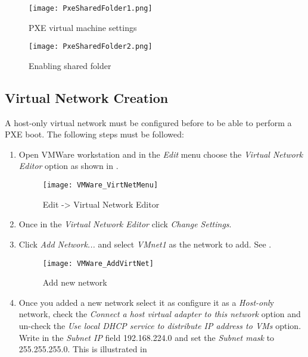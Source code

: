 \begin{appendices}
\begin{figure}
	\centering
	\texttt{[image: PxeSharedFolder1.png]}
		\caption{PXE virtual machine settings}
	\label{fig:PxeSharedFolder1}
\end{figure}

\begin{figure}
	\centering
	\texttt{[image: PxeSharedFolder2.png]}
		\caption{Enabling shared folder}
	\label{fig:PxeSharedFolder2}
\end{figure}

\subsection{Virtual Network Creation}
\label{sect:VirtNetwork}

A host-only virtual network must be configured before to be able to perform a PXE boot. The
following steps must be followed:

\begin{enumerate}
	\item Open VMWare workstation and in the \textit{Edit} menu choose the \textit{Virtual Network
Editor} option as shown in .

\begin{figure}
	\centering
	\texttt{[image: VMWare\_VirtNetMenu]}
		\caption{Edit -> Virtual Network Editor}
	\label{fig:VMwareMenu}
\end{figure}

	\item Once in the \textit{Virtual Network Editor} click \textit{Change Settings}.

	\item Click \textit{Add Network...} and select \textit{VMnet1} as the network to add. See
.

\begin{figure}
	\centering
	\texttt{[image: VMWare\_AddVirtNet]}
		\caption{Add new network}
	\label{fig:VmWareAddNetwork}
\end{figure}

	\item Once you added a new network select it as configure it as a \textit{Host-onl}y network,
check the \textit{Connect a host virtual adapter to this network} option and un-check the
\textit{Use local DHCP service to distribute IP address to VMs} option. Write in the
\textit{Subnet IP} field 192.168.224.0 and set the \textit{Subnet mask} to 255.255.255.0. This is
illustrated in 


\end{enumerate}
\end{appendices}
